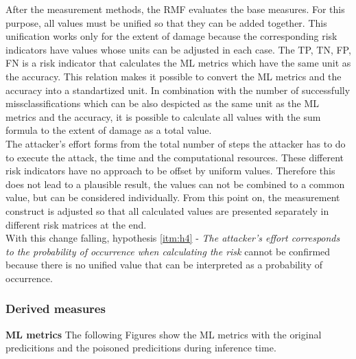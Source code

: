 After the measurement methods, the RMF evaluates the base measures. For this purpose, all values must be unified so that they can be added together. This unification works only for the extent of damage because the corresponding risk indicators have values whose units can be adjusted in each case. The TP, TN, FP, FN is a risk indicator that calculates the ML metrics which have the same unit as the accuracy. This relation makes it possible to convert the ML metrics and the accuracy into a standartized unit. In combination with the number of successfully missclassifications which can be also despicted as the same unit as the ML metrics and the accuracy, it is possible to calculate all values with the sum formula to the extent of damage as a total value. \\
The attacker's effort forms from the total number of steps the attacker has to do to execute the attack, the time and the computational resources. These different risk indicators have no approach to be offset by uniform values. Therefore this does not lead to a plausible result, the values can not be combined to a common value, but can be considered individually. From this point on, the measurement construct is adjusted so that all calculated values are presented separately in different risk matrices at the end. \\
With this change falling, hypothesis \ref{itm:h4} - \textit{The attacker's effort corresponds to the probability of occurrence when calculating the risk} cannot be confirmed because there is no unified value that can be interpreted as a probability of occurrence.

\subsubsection*{Derived measures}

\noindent\textbf{ML metrics} The following Figures show the ML metrics with the original predicitions and the poisoned predicitions during inference time.

